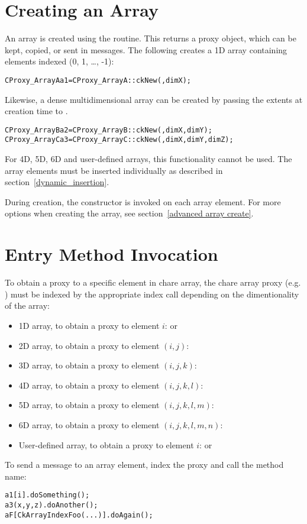 \section{Creating an Array}
\label{basic array creation}

An array is created using the  routine. This returns a
proxy object, which can be kept, copied, or sent in messages. The following
creates a 1D array containing elements indexed (0, 1, \ldots,
-1):
%
\begin{alltt}
CProxy_ArrayA a1 = CProxy_ArrayA::ckNew(, dimX);
\end{alltt}
%
Likewise, a dense multidimensional array can be created by passing the extents
at creation time to .
%
\begin{alltt}
CProxy_ArrayB a2 = CProxy_ArrayB::ckNew(, dimX, dimY);
CProxy_ArrayC a3 = CProxy_ArrayC::ckNew(, dimX, dimY, dimZ);
\end{alltt}
%
For 4D, 5D, 6D and user-defined arrays, this functionality cannot be used.  The
array elements must be inserted individually as described in
section~\ref{dynamic_insertion}.

During creation, the constructor is invoked on each array element. For more
options when creating the array, see section~\ref{advanced array create}.

\section{Entry Method Invocation}

To obtain a proxy to a specific element in chare array, the chare array proxy
(e.g. ) must be indexed by the appropriate index call depending
on the dimentionality of the array:
%
\begin{itemize}
\item 1D array, to obtain a proxy to element $i$:  or
\item 2D array, to obtain a proxy to element $(i,j)$: 
\item 3D array, to obtain a proxy to element $(i,j,k)$: 
\item 4D array, to obtain a proxy to element $(i,j,k,l)$:
\item 5D array, to obtain a proxy to element $(i,j,k,l,m)$:
\item 6D array, to obtain a proxy to element $(i,j,k,l,m,n)$:
\item User-defined array, to obtain a proxy to element $i$: 
  or 
\end{itemize}
%
To send a  message to an array element, index the proxy
and call the method name:
%
\begin{alltt}
a1[i].doSomething();
a3(x,y,z).doAnother();
aF[CkArrayIndexFoo(...)].doAgain();
\end{alltt}

